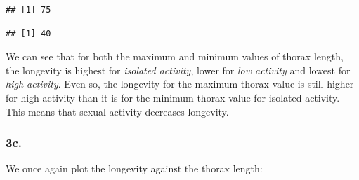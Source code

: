 \documentclass[
]{article}
\newenvironment{Shaded}{\begin{snugshade}}{\end{snugshade}}
\newcommand{\AttributeTok}[1]{\textcolor[rgb]{0.77,0.63,0.00}{#1}}
\newcommand{\DecValTok}[1]{\textcolor[rgb]{0.00,0.00,0.81}{#1}}
\newcommand{\FunctionTok}[1]{\textcolor[rgb]{0.00,0.00,0.00}{#1}}
\newcommand{\NormalTok}[1]{#1}
\newcommand{\SpecialCharTok}[1]{\textcolor[rgb]{0.00,0.00,0.00}{#1}}
\newcommand{\StringTok}[1]{\textcolor[rgb]{0.31,0.60,0.02}{#1}}
\begin{document}
\begin{Shaded}
\end{Shaded}

\begin{verbatim}
## [1] 75
\end{verbatim}

\begin{Shaded}
\end{Shaded}

\begin{verbatim}
## [1] 40
\end{verbatim}

We can see that for both the maximum and minimum values of thorax
length, the longevity is highest for \emph{isolated activity}, lower for
\emph{low activity} and lowest for \emph{high activity}. Even so, the
longevity for the maximum thorax value is still higher for high activity
than it is for the minimum thorax value for isolated activity. This
means that sexual activity decreases longevity.

\hypertarget{c.}{%
\subsubsection{3c.}\label{c.}}

We once again plot the longevity against the thorax length:

\begin{Shaded}
\end{Shaded}
\end{document}
